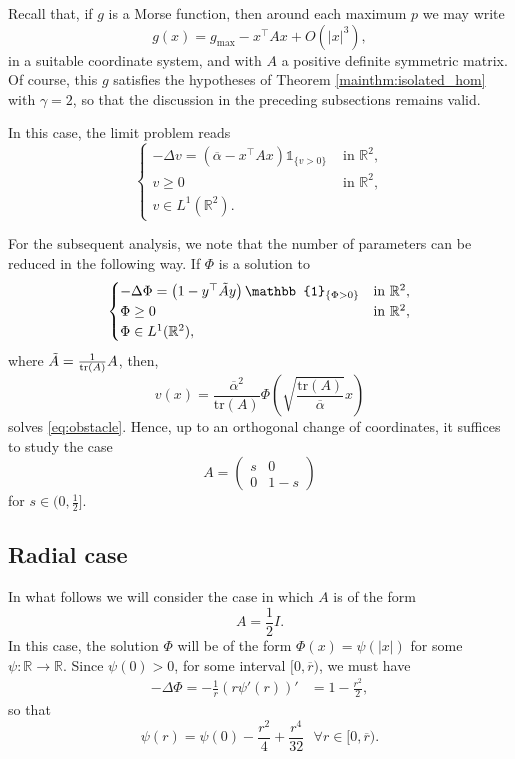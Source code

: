 \documentclass[10pt,a4paper]{article}
\newcommand{\gmax}{g_{\mathrm{max}}}
\newcommand{\RR}{\mathbb{R}}
\newcommand{\faskip}{\hspace{8pt}}
\numberwithin{equation}{section}
\begin{document}
Recall that, if $ g $ is a Morse function, then around each maximum $ p $ we may write
\[g(x) = \gmax - x^{\top}A x + O(|x|^{3}),\]
in a suitable coordinate system, and with $ A $ a positive definite symmetric matrix.  Of course, this $ g $ satisfies the hypotheses of Theorem \ref{mainthm:isolated_hom} with $ \gamma = 2 $, so that the discussion in the preceding subsections remains valid.

In this case, the limit problem reads
\begin{equation}
	\label{eq:obstacle}
	\begin{cases}
		-\Delta v = (\overline{\alpha} - x^{\top} A x) \mathbb{1}_{\{v>0\}} & \text{ in } \RR^2, \\
		v \geq 0 & \text{ in } \RR^2,\\
		v \in L^{1}(\RR^{2}).
	\end{cases}
\end{equation}

For the subsequent analysis, we note that the number of parameters can be reduced in the following way. If $\Phi$ is a solution to 
\begin{equation}
	\label{eq:obst_reduced}
	\begin{cases}
	-\Delta \Phi = \left( 1 - y^{\top}\Tilde{A}y  \right)\mathbb{1}_{\{\Phi>0\}} & \text{in } \RR^{2},\\ 
		\Phi \geq 0 & \text{in } \RR^{2}, \\
		\Phi \in L^{1}(\RR^{2}), 
	\end{cases}
\end{equation}
where $\Tilde{A} = \frac{1}{\text{tr}(A)}A$, then,
\begin{equation}
	\label{eq:v_hom}
	v(x) = \frac{\overline{\alpha}^{2}}{\text{tr}(A)} \Phi \left( \sqrt{\frac{\text{tr}(A)}{\overline{\alpha}}} x \right) 
\end{equation}
solves \eqref{eq:obstacle}. Hence, up to an orthogonal change of coordinates, it suffices to study the case
\[
	A = \begin{pmatrix}
		s & 0 \\ 
		0 & 1-s
	\end{pmatrix}
\]
for $s \in (0, \frac{1}{2}]$.

\subsection{Radial case}
\label{ssect:radial_case}

In what follows we will consider the case in which $A$ is of the form
\[A = \frac{1}{2} I.\]
In this case, the solution $\Phi$ will be of the form $\Phi(x) = \psi(|x|)$ for some $\psi:\RR \rightarrow \RR$. Since $\psi(0) > 0$, for some interval $[0, \overline{r})$, we must have
\begin{align*}
	-\Delta \Phi = -\frac{1}{r} (r \psi'(r))' &= 1 -  \frac{r^{2}}{2},
\end{align*}
so that 
\[\psi(r) = \psi(0) -\frac{r^{2}}{4} + \frac{r^{4}}{32} \faskip \forall r \in [0, \overline{r}).\]
\end{document}
